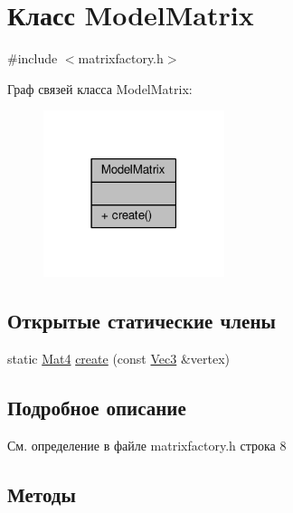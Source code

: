 \hypertarget{class_model_matrix}{}\section{Класс Model\+Matrix}
\label{class_model_matrix}


{\ttfamily \#include $<$matrixfactory.\+h$>$}



Граф связей класса Model\+Matrix\+:
\nopagebreak
\begin{figure}[H]
\begin{center}
\leavevmode
\includegraphics[width=150pt]{d0/dca/class_model_matrix__coll__graph}
\end{center}
\end{figure}
\subsection*{Открытые статические члены}
\begin{DoxyCompactItemize}
\item 
static \hyperlink{matrix_8h_a077dce9756976f552e5703c34475d5e3}{Mat4} \hyperlink{class_model_matrix_ac7cce9713a0c3f32b297de47efe7a088}{create} (const \hyperlink{vec3_8h_a221ad8ea4d9be4111628ee1ca22ee3ba}{Vec3} \&vertex)
\end{DoxyCompactItemize}


\subsection{Подробное описание}


См. определение в файле matrixfactory.\+h строка 8



\subsection{Методы}
